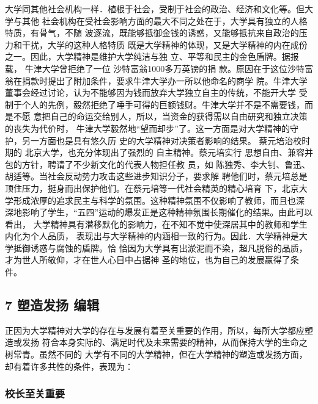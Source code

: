 \documentclass[11pt]{ctexart}
\begin{document}
{{{{大学同其他社会机构一样．植根于社会，受制于社会的政治、经济和文化等。但大学与其他
社会机构在受社会影响方面的最大不同之处在于，大学具有独立的人格特质，有骨气，不随
波逐流，既能够抵御金钱的诱惑，又能够抵抗来自政治的压力和干扰，大学的这种人格特质
既是大学精神的体现，又是大学精神的内在成份之一。因此，大学精神是维护大学纯洁与独
立、平等和民主的金色盾牌。据报载， 牛津大学曾拒绝了一位 沙特富翁1000多万英镑的捐
款。原因在于这位沙特富翁在捐款时提出了附加条件，要求牛津大学办一所以他命名的商学
院。牛津大学董事会经过讨论，认为不能够因为钱而放弃大学独立自主的传统，不能开大学
受制于个人的先例，毅然拒绝了唾手可得的巨额钱财。牛津大学并不是不需要钱，而是不愿
意把自己的命运交给别人，所以，当资金的获得需以自由研究和独立决策的丧失为代价时，
牛津大学毅然地“望而却步”了。这一方面是对大学精神的守护，另一方面也是具有悠久历
史的大学精神对决策者影响的结果。 蔡元培治校时期的 北京大学，也充分体现出了强烈的
自主精神。蔡元培实行 思想自由、兼容并包的方针，聘请了不少新文化的代表人物担任教
员，如 陈独秀、李大钊、鲁迅、 胡适等。当社会反动势力攻击这些进步知识分子，要求解
聘他们时，蔡元培总是顶住压力，挺身而出保护他们。在蔡元培等一代社会精英的精心培育
下，北京大学形成浓厚的追求民主与科学的氛围。这种精神氛围不仅影响了教师，而且也深
深地影响了学生，“五四”运动的爆发正是这种精神氛围长期催化的结果。由此可以看出，
大学精神具有潜移默化的影响力，在不知不觉中使深居其中的教师和学生内化为个人品质，
表现出与大学精神的内涵相一致的行为。因此．大学精神是大学抵御诱惑与腐蚀的盾牌。恰
恰因为大学具有出淤泥而不染，超凡脱俗的品质，才为世人所敬仰，才在世人心目中占据神
圣的地位，也为自己的发展赢得了条件。


\subsection{7 塑造发扬 编辑}
\label{sec:orga14e4b5}
正因为大学精神对大学的存在与发展有着至关重要的作用，所以，每所大学都应塑造或发扬
符合本身实际的、满足时代及未来需要的精神，从而保持大学的生命之树常青。虽然不同的
大学有不同的大学精神，但在大学精神的塑造或发扬方面，却有着许多共性的条件，表现为：


\subsubsection{校长至关重要}
\label{sec:org34e28c0}

}}}}
\end{document}
